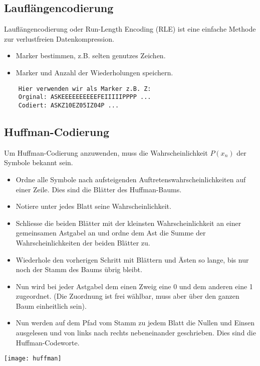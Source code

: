 \subsection{Lauflängencodierung}
Lauflängencodierung oder Run-Length Encoding (RLE) ist eine einfache Methode
zur verlustfreien Datenkompression.
\begin{itemize}
	\item Marker bestimmen, z.B. selten genutzes Zeichen.
	\item Marker und Anzahl der Wiederholungen speichern.
\end{itemize}
\begin{verbatim}
    Hier verwenden wir als Marker z.B. Z:
    Orginal: ASKEEEEEEEEEEFEIIIIIPPPP ...
    Codiert: ASKZ10EZ05IZ04P ...
\end{verbatim}
\subsection{Huffman-Codierung}
Um Huffman-Codierung anzuwenden, muss die Wahrscheinlichkeit $P(x_n)$ der Symbole bekannt sein.
\begin{itemize}
	\item Ordne alle Symbole nach aufsteigenden Auftretenswahrscheinlichkeiten auf einer Zeile. Dies sind die Blätter des Huffman-Baums.
	\item Notiere unter jedes Blatt seine Wahrscheinlichkeit.
	\item Schliesse die beiden Blätter mit der kleinsten Wahrscheinlichkeit an einer gemeinsamen Astgabel an und ordne dem Ast die Summe der Wahrscheinlichkeiten der beiden Blätter zu.
	\item Wiederhole den vorherigen Schritt mit Blättern und Ästen so lange, bis nur noch der Stamm des Baums übrig bleibt.
	\item Nun wird bei jeder Astgabel dem einen Zweig eine 0 und dem anderen eine 1 zugeordnet. (Die Zuordnung ist frei wählbar, muss aber über den ganzen Baum einheitlich sein).
	\item Nun werden auf dem Pfad vom Stamm zu jedem Blatt die Nullen und Einsen ausgelesen und von links nach rechts nebeneinander geschrieben. Dies sind die Huffman-Codeworte.
\end{itemize}
\texttt{[image: huffman]}

